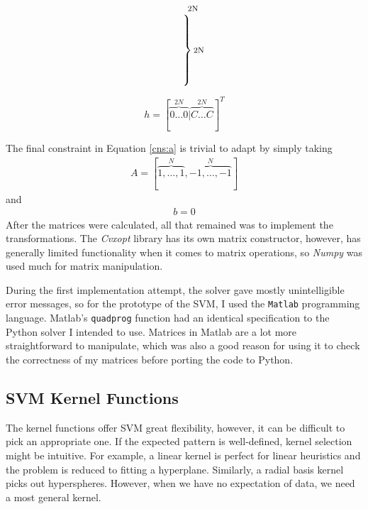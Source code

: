 \documentclass[12pt,notitlepage,twoside]{scrbook}
\begin{document}
\[\begin{matrix}
\begin{matrix}
      \text{\footnotesize 2N} \\
        \left.\vphantom{\begin{matrix} 0 \\ 0 \\ 0 \\ 0 \\ 0 \\ 0 \end{matrix}}\right\}
      \text{\footnotesize 2N} 
    \end{matrix}
    \mspace{-33mu}
\end{matrix}
\]


\[h = [\overbrace{0 \dots 0}^{2N}|\overbrace{C \dots C}^{2N}]^T\]

The final constraint in Equation \ref{cns:a} is trivial to adapt by simply taking 
\begin{gather*}
A=[\overbrace{1,\dots,1}^N,\overbrace{-1,\dots,-1}^N]
\end{gather*}
and
\begin{gather*}
b=0
\end{gather*}
After the matrices were calculated, all that remained was to implement the
transformations. The \textit{Cvxopt} library has its own matrix constructor,
however, has generally limited functionality when it comes to matrix
operations, so \textit{Numpy} was used much for matrix manipulation.

During the first implementation attempt, the solver gave mostly unintelligible
error messages, so for the prototype of the SVM, I used the 
\texttt{Matlab} programming language. Matlab's \texttt{quadprog} function had an identical
specification to the Python solver I intended to use.  Matrices in Matlab are a
lot more straightforward to manipulate, which was also a good reason for using it
to check the correctness of my matrices before porting the code to Python.

\subsection{SVM Kernel Functions}
\label{sec:kernels}
The kernel functions offer SVM great flexibility, however, it can be difficult to pick an
appropriate one. If the expected pattern is well-defined, kernel selection might be
intuitive. For example, a linear kernel is perfect for linear heuristics and the problem
is reduced to fitting a hyperplane.  Similarly, a radial basis kernel picks out
hyperspheres. However, when we have no expectation of data, we need a most
general kernel.
\end{document}
